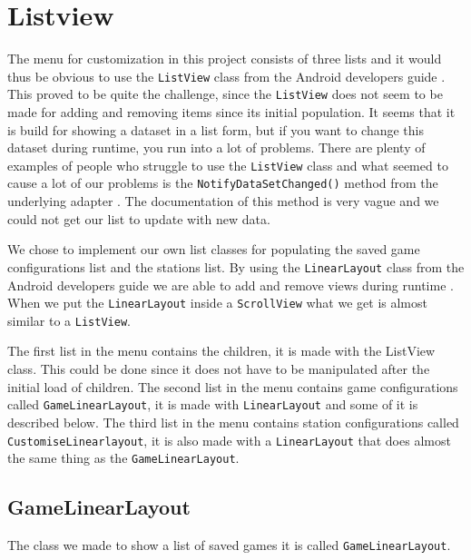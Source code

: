\section{Listview}\label{sec:listview}
The menu for customization in this project consists of three lists and it would thus be obvious to use the \lstinline|ListView| class from the Android developers guide \citep{androidlayouts}. This proved to be quite the challenge, since the \lstinline|ListView| does not seem to be made for adding and removing items since its initial population. It seems that it is build for showing a dataset in a list form, but if you want to change this dataset during runtime, you run into a lot of problems. There are plenty of examples of people who struggle to use the \lstinline|ListView| class and what seemed to cause a lot of our problems is the \lstinline|NotifyDataSetChanged()| method from the underlying adapter \citep{listviewfail,notifydatasetchanged}. The documentation of this method is very vague and we could not get our list to update with new data.

We chose to implement our own list classes for populating the saved game configurations list and the stations list. By using the \lstinline|LinearLayout| class from the Android developers guide we are able to add and remove views during runtime \citep{androidlayouts}. When we put the \lstinline|LinearLayout| inside a \lstinline|ScrollView| what we get is almost similar to a \lstinline|ListView|.

The first list in the menu contains the children, it is made with the ListView class. This could be done since it does not have to be manipulated after the initial load of children. The second list in the menu contains game configurations called \lstinline|GameLinearLayout|, it is made with \lstinline|LinearLayout| and some of it is described below. The third list in the menu contains station configurations called \lstinline|CustomiseLinearlayout|, it is also made with a \lstinline|LinearLayout| that does almost the same thing as the \lstinline|GameLinearLayout|.

\subsection*{GameLinearLayout}

The class we made to show a list of saved games it is called \lstinline|GameLinearLayout|.

